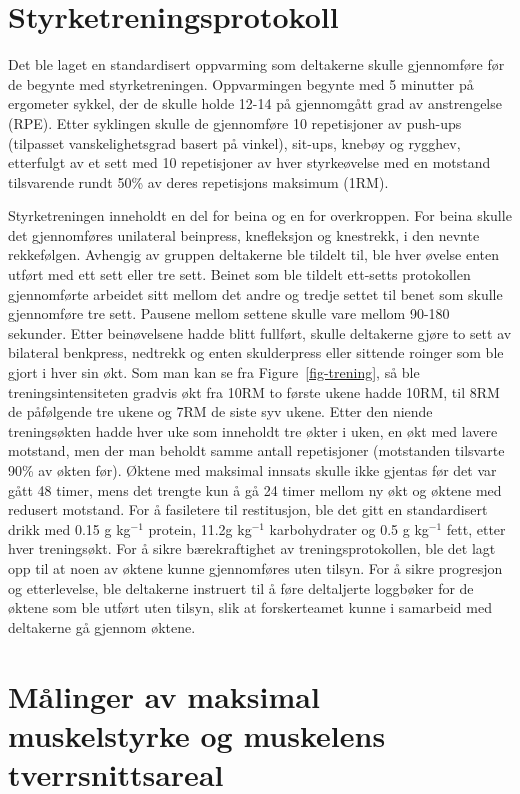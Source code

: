 \documentclass[
  letterpaper,
  DIV=11,
  numbers=noendperiod]{scrreprt}
\begin{document}
\section{Styrketreningsprotokoll}\label{styrketreningsprotokoll}

Det ble laget en standardisert oppvarming som deltakerne skulle
gjennomføre før de begynte med styrketreningen. Oppvarmingen begynte med
5 minutter på ergometer sykkel, der de skulle holde 12-14 på gjennomgått
grad av anstrengelse (RPE). Etter syklingen skulle de gjennomføre 10
repetisjoner av push-ups (tilpasset vanskelighetsgrad basert på vinkel),
sit-ups, knebøy og rygghev, etterfulgt av et sett med 10 repetisjoner av
hver styrkeøvelse med en motstand tilsvarende rundt 50\% av deres
repetisjons maksimum (1RM).

Styrketreningen inneholdt en del for beina og en for overkroppen. For
beina skulle det gjennomføres unilateral beinpress, knefleksjon og
knestrekk, i den nevnte rekkefølgen. Avhengig av gruppen deltakerne ble
tildelt til, ble hver øvelse enten utført med ett sett eller tre sett.
Beinet som ble tildelt ett-setts protokollen gjennomførte arbeidet sitt
mellom det andre og tredje settet til benet som skulle gjennomføre tre
sett. Pausene mellom settene skulle vare mellom 90-180 sekunder. Etter
beinøvelsene hadde blitt fullført, skulle deltakerne gjøre to sett av
bilateral benkpress, nedtrekk og enten skulderpress eller sittende
roinger som ble gjort i hver sin økt. Som man kan se fra
Figure~\ref{fig-trening}, så ble treningsintensiteten gradvis økt fra
10RM to første ukene hadde 10RM, til 8RM de påfølgende tre ukene og 7RM
de siste syv ukene. Etter den niende treningsøkten hadde hver uke som
inneholdt tre økter i uken, en økt med lavere motstand, men der man
beholdt samme antall repetisjoner (motstanden tilsvarte 90\% av økten
før). Øktene med maksimal innsats skulle ikke gjentas før det var gått
48 timer, mens det trengte kun å gå 24 timer mellom ny økt og øktene med
redusert motstand. For å fasiletere til restitusjon, ble det gitt en
standardisert drikk med 0.15 g kg\(^{-1}\) protein, 11.2g kg\(^{-1}\)
karbohydrater og 0.5 g kg\(^{-1}\) fett, etter hver treningsøkt. For å
sikre bærekraftighet av treningsprotokollen, ble det lagt opp til at
noen av øktene kunne gjennomføres uten tilsyn. For å sikre progresjon og
etterlevelse, ble deltakerne instruert til å føre deltaljerte loggbøker
for de øktene som ble utført uten tilsyn, slik at forskerteamet kunne i
samarbeid med deltakerne gå gjennom øktene.

\section{Målinger av maksimal muskelstyrke og muskelens
tverrsnittsareal}\label{muxe5linger-av-maksimal-muskelstyrke-og-muskelens-tverrsnittsareal}
\end{document}
